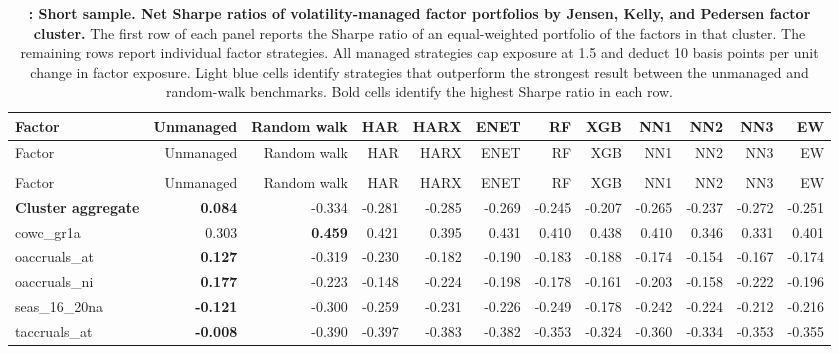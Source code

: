 \begin{landscape}
\begingroup\scriptsize
\captionsetup{justification=raggedright,labelsep=none,singlelinecheck=false,labelformat=boldlabel}
\setlength{\tabcolsep}{2.5pt}
\begin{longtable}{>{\raggedright\arraybackslash}p{2.6cm}rrrrrrrrrrr}
\caption[Net Sharpe ratios of volatility-managed factor portfolios by Jensen, Kelly, and Pedersen factor cluster.]{\footnotesize \textbf{: Short sample. Net Sharpe ratios of volatility-managed factor portfolios by Jensen, Kelly, and Pedersen factor cluster.} The first row of each panel reports the Sharpe ratio of an equal-weighted portfolio of the factors in that cluster. The remaining rows report individual factor strategies. All managed strategies cap exposure at 1.5 and deduct 10 basis points per unit change in factor exposure. Light blue cells identify strategies that outperform the strongest result between the unmanaged and random-walk benchmarks. Bold cells identify the highest Sharpe ratio in each row.}\label{tab:rv-portfolio_factor_sharpe-short}\\
\hline
Factor & Unmanaged & Random walk & HAR & HARX & ENET & RF & XGB & NN1 & NN2 & NN3 & EW \\
\hline\endfirsthead
\hline
Factor & Unmanaged & Random walk & HAR & HARX & ENET & RF & XGB & NN1 & NN2 & NN3 & EW \\
\hline\endhead
\hline\endfoot
\multicolumn{12}{@{}l}{\textit{Panel A. Accruals}} \\
\hline
Factor & Unmanaged & Random walk & HAR & HARX & ENET & RF & XGB & NN1 & NN2 & NN3 & EW \\
\hline
\textbf{Cluster aggregate} & \textbf{0.084} & -0.334 & -0.281 & -0.285 & -0.269 & -0.245 & -0.207 & -0.265 & -0.237 & -0.272 & -0.251 \\
cowc\_gr1a & 0.303 & \textbf{0.459} & 0.421 & 0.395 & 0.431 & 0.410 & 0.438 & 0.410 & 0.346 & 0.331 & 0.401 \\
oaccruals\_at & \textbf{0.127} & -0.319 & -0.230 & -0.182 & -0.190 & -0.183 & -0.188 & -0.174 & -0.154 & -0.167 & -0.174 \\
oaccruals\_ni & \textbf{0.177} & -0.223 & -0.148 & -0.224 & -0.198 & -0.178 & -0.161 & -0.203 & -0.158 & -0.222 & -0.196 \\
seas\_16\_20na & \textbf{-0.121} & -0.300 & -0.259 & -0.231 & -0.226 & -0.249 & -0.178 & -0.242 & -0.224 & -0.212 & -0.216 \\
taccruals\_at & \textbf{-0.008} & -0.390 & -0.397 & -0.383 & -0.382 & -0.353 & -0.324 & -0.360 & -0.334 & -0.353 & -0.355 \\

\end{longtable}
\end{landscape}

